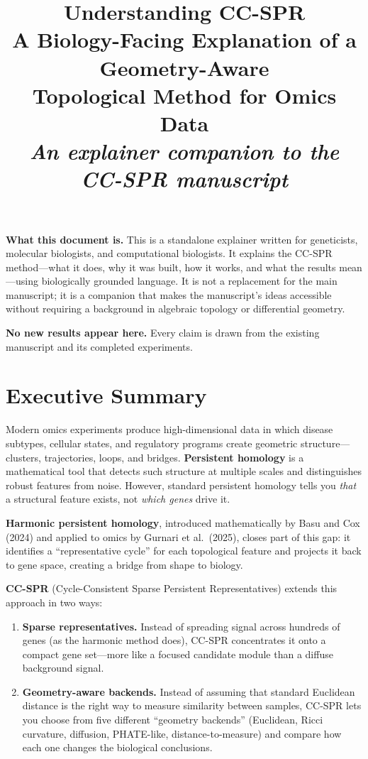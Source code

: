 \documentclass[11pt]{article}
\title{\Large\textbf{Understanding CC-SPR}\\[6pt]
\large A Biology-Facing Explanation of a Geometry-Aware\\Topological Method for Omics Data\\[12pt]
\normalsize\textit{An explainer companion to the CC-SPR manuscript}}
\author{}
\date{}
\makeatletter
\newenvironment{keybox}{%
  \par\vspace{8pt}\noindent\fboxrule=1.5pt\fboxsep=8pt%
  \begin{lrbox}{\@tempboxa}\begin{minipage}{\dimexpr\linewidth-2\fboxsep-2\fboxrule}}%
  {\end{minipage}\end{lrbox}\fcolorbox{black}{white}{\usebox{\@tempboxa}}\par\vspace{8pt}}
\makeatother
\begin{document}
\maketitle
\thispagestyle{empty}

\vspace{-1em}

\begin{keybox}
\textbf{What this document is.}
This is a standalone explainer written for geneticists, molecular biologists, and computational biologists.
It explains the CC-SPR method---what it does, why it was built, how it works, and what the results mean---using biologically grounded language.
It is not a replacement for the main manuscript; it is a companion that makes the manuscript's ideas accessible without requiring a background in algebraic topology or differential geometry.

\medskip
\textbf{No new results appear here.} Every claim is drawn from the existing manuscript and its completed experiments.
\end{keybox}

\tableofcontents
\newpage

\section{Executive Summary}
\label{sec:executive}

Modern omics experiments produce high-dimensional data in which disease subtypes, cellular states, and regulatory programs create geometric structure---clusters, trajectories, loops, and bridges.
\textbf{Persistent homology} is a mathematical tool that detects such structure at multiple scales and distinguishes robust features from noise.
However, standard persistent homology tells you \emph{that} a structural feature exists, not \emph{which genes} drive it.

\textbf{Harmonic persistent homology}, introduced mathematically by Basu and Cox (2024) and applied to omics by Gurnari et al.\ (2025), closes part of this gap: it identifies a ``representative cycle'' for each topological feature and projects it back to gene space, creating a bridge from shape to biology.

\textbf{CC-SPR} (Cycle-Consistent Sparse Persistent Representatives) extends this approach in two ways:
\begin{enumerate}[leftmargin=1.5em]
\item \textbf{Sparse representatives.} Instead of spreading signal across hundreds of genes (as the harmonic method does), CC-SPR concentrates it onto a compact gene set---more like a focused candidate module than a diffuse background signal.
\item \textbf{Geometry-aware backends.} Instead of assuming that standard Euclidean distance is the right way to measure similarity between samples, CC-SPR lets you choose from five different ``geometry backends'' (Euclidean, Ricci curvature, diffusion, PHATE-like, distance-to-measure) and compare how each one changes the biological conclusions.
\end{enumerate}
\end{document}
